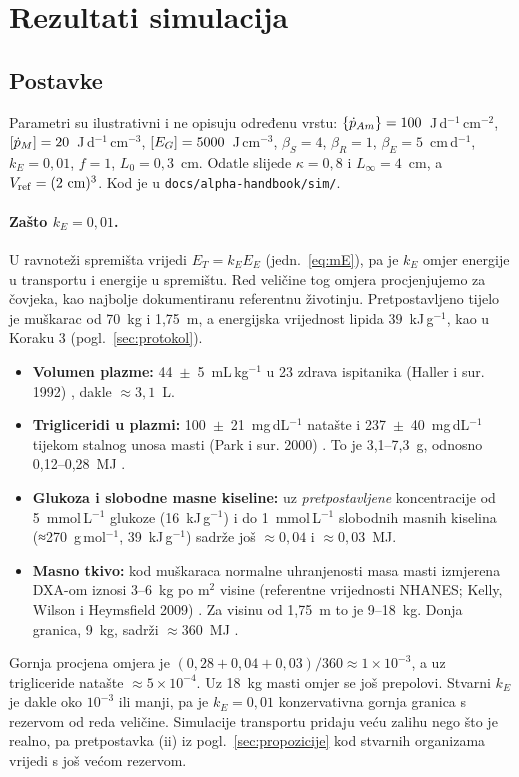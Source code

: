 \section{Rezultati simulacija}\label{sec:simulacije}

\subsection{Postavke}

Parametri su ilustrativni i ne opisuju određenu vrstu: $\{\dot p_{Am}\}=100$~J\,d$^{-1}$\,cm$^{-2}$, $[\dot p_M]=20$~J\,d$^{-1}$\,cm$^{-3}$, $[E_G]=5000$~J\,cm$^{-3}$, $\beta_S=4$, $\beta_R=1$, $\beta_E=5$~cm\,d$^{-1}$, $k_E=0{,}01$, $f=1$, $L_0=0{,}3$~cm. Odatle slijede $\kappa=0{,}8$ i $L_\infty=4$~cm, a $V_{\mathrm{ref}}=(2~\text{cm})^3$. Kod je u \texttt{docs/alpha-handbook/sim/}.

\paragraph{Zašto $k_E=0{,}01$.} U ravnoteži spremišta vrijedi $E_T=k_E E_E$ (jedn.~\eqref{eq:mE}), pa je $k_E$ omjer energije u transportu i energije u spremištu. Red veličine tog omjera procjenjujemo za čovjeka, kao najbolje dokumentiranu referentnu životinju. Pretpostavljeno tijelo je muškarac od 70~kg i 1,75~m, a energijska vrijednost lipida $39$~kJ\,g$^{-1}$, kao u Koraku 3 (pogl.~\ref{sec:protokol}).
\begin{itemize}
\item \textbf{Volumen plazme:} 44~$\pm$~5~mL\,kg$^{-1}$ u 23 zdrava ispitanika (Haller i sur. 1992) , dakle $\approx3{,}1$~L.
\item \textbf{Trigliceridi u plazmi:} 100~$\pm$~21~mg\,dL$^{-1}$ natašte i 237~$\pm$~40~mg\,dL$^{-1}$ tijekom stalnog unosa masti (Park i sur. 2000) . To je 3,1–7,3~g, odnosno 0,12–0,28~MJ .
\item \textbf{Glukoza i slobodne masne kiseline:} uz \emph{pretpostavljene} koncentracije od 5~mmol\,L$^{-1}$ glukoze (16~kJ\,g$^{-1}$) i do 1~mmol\,L$^{-1}$ slobodnih masnih kiselina (≈270~g\,mol$^{-1}$, 39~kJ\,g$^{-1}$) sadrže još $\approx0{,}04$ i $\approx0{,}03$~MJ.
\item \textbf{Masno tkivo:} kod muškaraca normalne uhranjenosti masa masti izmjerena DXA-om iznosi 3–6~kg po m$^2$ visine (referentne vrijednosti NHANES; Kelly, Wilson i Heymsfield 2009) . Za visinu od 1,75~m to je 9–18~kg. Donja granica, 9~kg, sadrži $\approx360$~MJ .
\end{itemize}
Gornja procjena omjera je $(0{,}28+0{,}04+0{,}03)/360\approx1\times10^{-3}$, a uz trigliceride natašte $\approx5\times10^{-4}$. Uz 18~kg masti omjer se još prepolovi. Stvarni $k_E$ je dakle oko $10^{-3}$ ili manji, pa je $k_E=0{,}01$ konzervativna gornja granica s rezervom od reda veličine. Simulacije transportu pridaju veću zalihu nego što je realno, pa pretpostavka (ii) iz pogl.~\ref{sec:propozicije} kod stvarnih organizama vrijedi s još većom rezervom.

